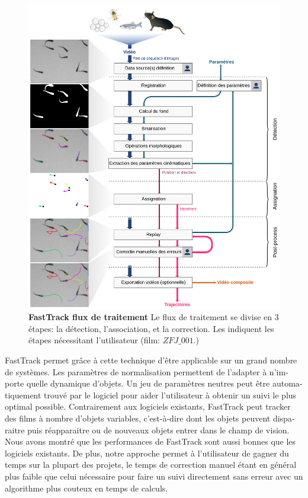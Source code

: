 \begin{otherlanguage}{french}
    \begin{figure}[h!]
      \centering
      \includegraphics[width=1\textwidth]{part_1/assets/Figure_1_fr.png}
        \caption{{\bf FastTrack flux de traitement} Le flux de traitement se divise en 3 étapes: la détection, l'association, et la correction. Les \faUser indiquent les étapes nécessitant l'utilisateur (film: $ZFJ\_001$.)}
      \label{}
    \end{figure}

FastTrack permet grâce à cette technique d'être applicable sur un grand nombre de systèmes. Les paramètres de normalisation permettent de l'adapter à n'importe quelle dynamique d'objets. Un jeu de paramètres neutres peut être automatiquement trouvé par le logiciel pour aider l'utilisateur à obtenir un suivi le plus optimal possible. Contrairement aux logiciels existants, FastTrack peut tracker des films à nombre d'objets variables, c’est-à-dire dont les objets peuvent disparaitre puis réapparaitre ou de nouveaux objets entrer dans le champ de vision. Nous avons montré que les performances de FastTrack sont aussi bonnes que les logiciels existants. De plus, notre approche permet à l'utilisateur de gagner du temps sur la plupart des projets, le temps de correction manuel étant en général plus faible que celui nécessaire pour faire un suivi directement sans erreur avec un algorithme plus couteux en temps de calculs.


\end{otherlanguage}
